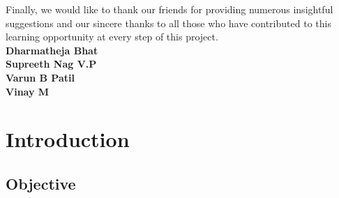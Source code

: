 \documentclass[11pt,a4paper]{report}
\renewcommand{\headrulewidth}{0.4pt}
\renewcommand{\footrulewidth}{0.4pt}
\begin{document}
{\justifying
\setlength{\parindent}{1cm}
Finally, we would like to thank our friends for providing numerous insightful suggestions and our sincere thanks to all those who have contributed to this learning opportunity at every step of this project.\\

{\flushright
\textbf{Dharmatheja Bhat}\\
\textbf{Supreeth Nag V.P}\\
\textbf{Varun B Patil}\\
\textbf{Vinay M}\\}
\newpage





\doublespacing
\tableofcontents
\thispagestyle{plain}
\clearpage		%
\listoffigures
\thispagestyle{plain}
\clearpage		%
\singlespacing




\linespread{1.5}
\fontsize{12}{12}	%
\selectfont

\pagestyle{fancy}
\fancyhead{}
\fancyfoot{}
\renewcommand{\headrulewidth}{0.6pt}
\renewcommand{\footrulewidth}{0.6pt}
\setcounter{page}{1} %

\chapter{Introduction}

\section{Objective}

}
\end{document}

